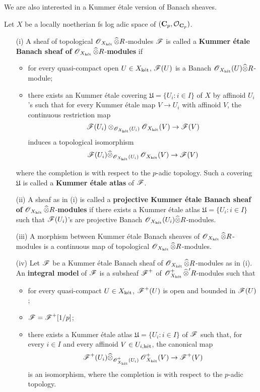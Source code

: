 We are also interested in a Kummer \'etale version of Banach sheaves.

\begin{Definition}\label{Definition: Kummer etale Banach sheaf}
Let $X$ be a locally noetherian fs log adic space of $(\C_p, \calO_{\C_p})$.
\begin{enumerate}
\item[(i)] A sheaf of topological $\scrO_{X_{\ket}}\widehat{\otimes}R$-modules $\scrF$ is called a \textbf{Kummer \'etale Banach sheaf of} $\scrO_{X_{\ket}}\widehat{\otimes}R$-\textbf{modules} if
\begin{itemize}
\item for every quasi-compact open $U\in X_{\ket}$, $\scrF(U)$ is a Banach $\scrO_{X_{\ket}}(U)\widehat{\otimes} R$-module;
\item there exists an Kummer \'etale covering $\mathfrak{U}=\{U_i: i\in I\}$ of $X$ by affinoid $U_i$'s such that for every Kummer \'etale map $V\rightarrow U_i$ with affinoid $V$, the continuous restriction map
\[\scrF(U_i)\otimes_{\scrO_{X_{\ket}}(U_i)}\scrO_{X_{\ket}}(V)\rightarrow \scrF(V)\]
induces a topological isomorphism
\[\scrF(U_i)\widehat{\otimes}_{\scrO_{X_{\ket}}(U_i)}\scrO_{X_{\ket}}(V)\rightarrow \scrF(V)\]
\end{itemize}
where the completion is with respect to the $p$-adic topology. Such a covering $\mathfrak{U}$ is called a \textbf{Kummer \'etale atlas} of $\scrF$.

\item[(ii)] A sheaf as in (i) is called a \textbf{projective Kummer \'etale Banach sheaf of} $\scrO_{X_{\ket}}\widehat{\otimes} R$-\textbf{modules} if there exists a Kummer \'etale atlas $\mathfrak{U}=\{U_i: i\in I\}$ such that $\scrF(U_i)$'s are projective Banach $\scrO_{X_{\ket}}(U_i)\widehat{\otimes}R$-modules.
\item[(iii)] A morphism between Kummer \'etale Banach sheaves of $\scrO_{X_{\ket}}\widehat{\otimes}R$-modules is a continuous map of topological $\scrO_{X_{\ket}}\widehat{\otimes}R$-modules.
\item[(iv)] Let $\scrF$ be a Kummer \'etale Banach sheaf of $\scrO_{X_{\ket}}\widehat{\otimes}R$-modules as in (i). An \textbf{integral model} of $\scrF$ is a subsheaf $\scrF^+$ of $\scrO^+_{X_{\ket}}\widehat{\otimes}'R$-modules such that
\begin{itemize}
\item for every quasi-compact $U\in X_{\ket}$, $\scrF^+(U)$ is open and bounded in $\scrF(U)$;
\item $\scrF=\scrF^+[1/p]$;
\item there exists a Kummer \'etale atlas $\mathfrak{U}=\{U_i:i\in I\}$ of $\scrF$ such that, for every $i\in I$ and every affinoid $V\in U_{i,\ket}$, the canonical map
\[\scrF^+(U_i)\widehat{\otimes}_{\scrO^+_{X_{\ket}}(U_i)}\scrO^+_{X_{\ket}}(V)\rightarrow \scrF^+(V)\]
is an isomorphism, where the completion is with respect to the $p$-adic topology.
\end{itemize}
\end{enumerate}
\end{Definition}


